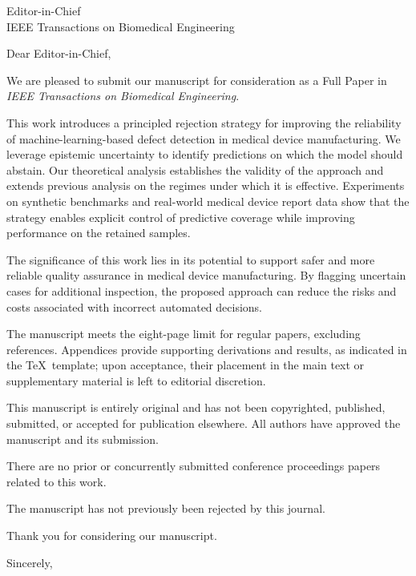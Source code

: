 \documentclass[11pt]{letter}
\begin{document}
\begin{letter}{Editor-in-Chief\\
        IEEE Transactions on Biomedical Engineering}

    \opening{Dear Editor-in-Chief,}

    We are pleased to submit our manuscript \emph{\customtitle} for consideration as a Full Paper in
    \textit{IEEE Transactions on Biomedical Engineering}.

    This work introduces a principled rejection strategy for improving
    the reliability of machine-learning-based defect detection in medical
    device manufacturing. We leverage epistemic uncertainty to identify
    predictions on which the model should abstain. Our theoretical analysis
    establishes the validity of the approach and extends previous analysis on the regimes under which it is effective. Experiments on
    synthetic benchmarks and real-world medical device report data show
    that the strategy enables explicit control of predictive coverage while
    improving performance on the retained samples.

    The significance of this work lies in its potential to support safer
    and more reliable quality assurance in medical device manufacturing.
    By flagging uncertain cases for additional inspection, the proposed
    approach can reduce the risks and costs associated with incorrect
    automated decisions.

    The manuscript meets the eight-page limit for regular papers, excluding references. Appendices provide supporting derivations and results, as indicated in the \TeX\ template; upon acceptance, their placement in the main text or supplementary material is left to editorial discretion.

    This manuscript is entirely original and has not been
    copyrighted, published, submitted, or accepted for publication
    elsewhere. All authors have approved the manuscript and its submission.

    There are no prior or concurrently submitted conference proceedings
    papers related to this work.


    The manuscript has not previously been rejected by this journal.

    Thank you for considering our manuscript.
    \vspace{\baselineskip}
    \closing{Sincerely,}

\end{letter}
\end{document}
